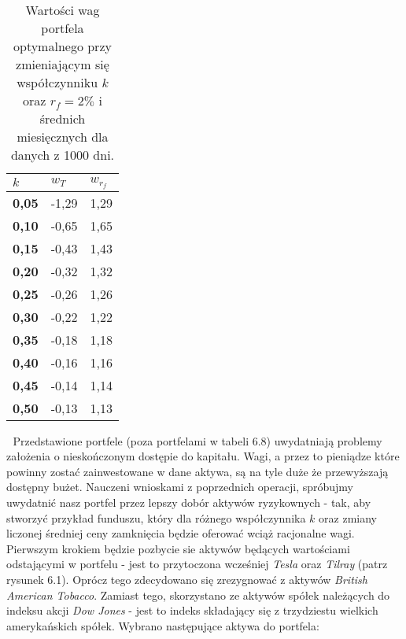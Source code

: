 \documentclass[magister]{dyplom}
\begin{document}
\begin{table}[ht]
	\centering
	\caption{Wartości wag portfela optymalnego przy zmieniającym się współczynniku $k$ oraz $r_f = 2\%$ i średnich miesięcznych dla danych z 1000 dni.}
	\begin{tabular}{|l|l|l|}
		\hline
		\textbf{$k$} & \textbf{$w_T$} & \textbf{$w_{r_f}$} \\ \hline
		\textbf{0,05}                                             & -1,29         & 1,29           \\ \hline
		\textbf{0,10}                                             & -0,65         & 1,65           \\ \hline
		\textbf{0,15}                                             & -0,43         & 1,43           \\ \hline
		\textbf{0,20}                                             & -0,32         & 1,32           \\ \hline
		\textbf{0,25}                                             & -0,26         & 1,26           \\ \hline
		\textbf{0,30}                                             & -0,22         & 1,22           \\ \hline
		\textbf{0,35}                                             & -0,18         & 1,18           \\ \hline
		\textbf{0,40}                                             & -0,16         & 1,16           \\ \hline
		\textbf{0,45}                                             & -0,14         & 1,14           \\ \hline
		\textbf{0,50}                                             & -0,13         & 1,13           \\ \hline
	\end{tabular}
\end{table}
\newpage
\textcolor{white}{.}
\newpage
Przedstawione portfele (poza portfelami w tabeli 6.8) uwydatniają problemy założenia o nieskończonym dostępie do kapitału.\cite{simplifiedmarkowitz} Wagi, a przez to pieniądze które powinny zostać zainwestowane w dane aktywa, są na tyle duże że przewyższają dostępny bużet.
Nauczeni wnioskami z poprzednich operacji, spróbujmy uwydatnić nasz portfel przez lepszy dobór aktywów ryzykownych - tak, aby stworzyć przykład funduszu, który dla różnego współczynnika $k$ oraz zmiany liczonej średniej ceny zamknięcia będzie oferować wciąż racjonalne wagi. Pierwszym krokiem będzie pozbycie sie aktywów będących wartościami odstającymi w portfelu - jest to przytoczona wcześniej \textit{Tesla} oraz \textit{Tilray} (patrz rysunek 6.1). Oprócz tego zdecydowano się zrezygnować z aktywów \textit{British American Tobacco}. Zamiast tego, skorzystano ze aktywów spółek należących do indeksu akcji \textit{Dow Jones} - jest to indeks składający się z trzydziestu wielkich amerykańskich spółek. Wybrano następujące aktywa do portfela:
\end{document}
